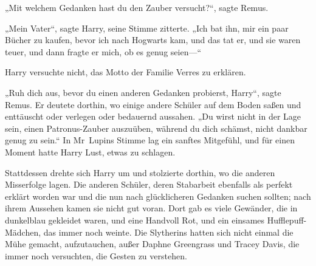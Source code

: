 „Mit welchem Gedanken hast du den Zauber versucht?“, sagte Remus.

„Mein Vater“, sagte Harry, seine Stimme zitterte. „Ich bat ihn, mir ein paar Bücher zu kaufen, bevor ich nach Hogwarts kam, und das tat er, und sie waren teuer, und dann fragte er mich, ob es genug seien—“

Harry versuchte nicht, das Motto der Familie Verres zu erklären.

„Ruh dich aus, bevor du einen anderen Gedanken probierst, Harry“, sagte Remus. Er deutete dorthin, wo einige andere Schüler auf dem Boden saßen und enttäuscht oder verlegen oder bedauernd aussahen. „Du wirst nicht in der Lage sein, einen Patronus-Zauber auszuüben, während du dich schämst, nicht dankbar genug zu sein.“ In Mr~Lupins Stimme lag ein sanftes Mitgefühl, und für einen Moment hatte Harry Lust, etwas zu schlagen.

Stattdessen drehte sich Harry um und stolzierte dorthin, wo die anderen Misserfolge lagen. Die anderen Schüler, deren Stabarbeit ebenfalls als perfekt erklärt worden war und die nun nach glücklicheren Gedanken suchen sollten; nach ihrem Aussehen kamen sie nicht gut voran. Dort gab es viele Gewänder, die in dunkelblau gekleidet waren, und eine Handvoll Rot, und ein einsames Hufflepuff-Mädchen, das immer noch weinte. Die Slytherins hatten sich nicht einmal die Mühe gemacht, aufzutauchen, außer Daphne Greengrass und Tracey Davis, die immer noch versuchten, die Gesten zu verstehen.

